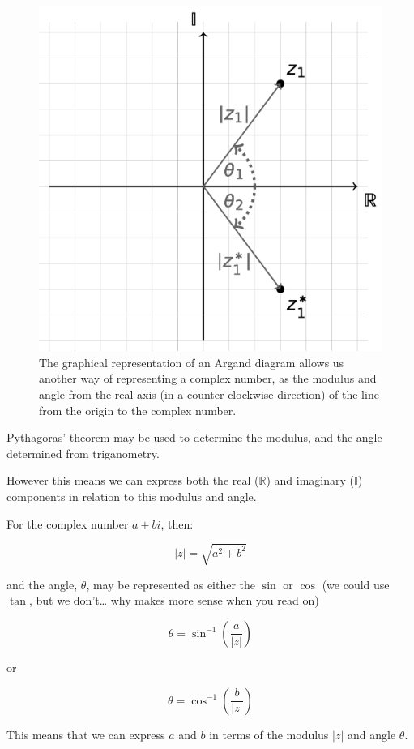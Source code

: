 \documentclass[
]{book}
\begin{document}
\begin{figure}

{\centering \includegraphics[width=0.5\linewidth]{images/argandangle} 

}

\caption{The graphical representation of an Argand diagram allows us another way of representing a complex number, as the modulus and angle from the real axis (in a counter-clockwise direction) of the line from the origin to the complex number.}\label{fig:argandangle}
\end{figure}

Pythagoras' theorem may be used to determine the modulus, and the angle determined from triganometry.

However this means we can express both the real (\(\mathbb{R}\)) and imaginary (\(\mathbb{I}\)) components in relation to this modulus and angle.

For the complex number \(a+bi\), then:

\begin{equation*}
|z| = \sqrt{a^2+b^2}
\end{equation*}

and the angle, \(\theta\), may be represented as either the \(\sin\) or \(\cos\) (we could use \(\tan\), but we don't\ldots{} why makes more sense when you read on)

\begin{equation*}
\theta =  \sin^{-1} \left(\frac{a}{|z|}\right)
\end{equation*}

or

\begin{equation*}
\theta =  \cos^{-1} \left(\frac{b}{|z|}\right)
\end{equation*}

This means that we can express \(a\) and \(b\) in terms of the modulus \(|z|\) and angle \(\theta\).
\end{document}
